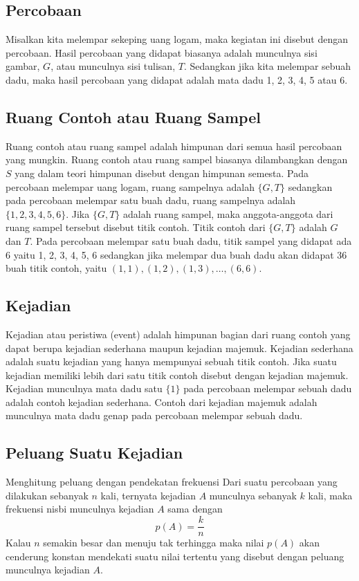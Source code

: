     \subsection{Percobaan}
Misalkan kita melempar sekeping uang logam, maka kegiatan ini disebut dengan percobaan. Hasil 
percobaan yang didapat biasanya adalah munculnya sisi gambar, $G$, atau munculnya sisi tulisan, $T$. 
Sedangkan jika kita melempar sebuah dadu, maka hasil percobaan yang didapat adalah mata dadu 1, 
2, 3, 4, 5 atau 6. 

\subsection{Ruang Contoh atau Ruang Sampel} 
Ruang contoh atau ruang sampel adalah himpunan dari semua hasil percobaan yang mungkin. Ruang 
contoh atau ruang sampel biasanya dilambangkan dengan $S$ yang dalam teori himpunan disebut 
dengan himpunan semesta. 
Pada percobaan melempar uang logam, ruang sampelnya adalah $\{G, T\}$ sedangkan pada percobaan
melempar satu buah dadu, ruang sampelnya adalah $\{1, 2, 3, 4, 5, 6\}$. 
Jika $\{G, T\}$ adalah ruang sampel, maka anggota-anggota dari ruang sampel tersebut disebut titik
contoh. Titik contoh dari $\{G, T\}$ adalah $G$ dan $T$. Pada percobaan melempar satu buah dadu, titik 
sampel yang didapat ada 6 yaitu 1, 2, 3, 4, 5, 6 sedangkan jika melempar dua buah dadu akan didapat
36 buah titik contoh, yaitu $(1, 1), (1, 2), (1, 3), \dots , (6, 6)$. 

\subsection{Kejadian}
Kejadian atau peristiwa (event) adalah himpunan bagian dari ruang contoh yang dapat berupa
kejadian sederhana maupun kejadian majemuk. Kejadian sederhana adalah suatu kejadian yang
hanya mempunyai sebuah titik contoh. Jika suatu kejadian memiliki lebih dari satu titik contoh 
disebut dengan kejadian majemuk. 
Kejadian munculnya mata dadu satu $\{1\}$ pada percobaan melempar sebuah dadu adalah contoh 
kejadian sederhana. Contoh dari kejadian majemuk adalah munculnya mata dadu genap pada 
percobaan melempar sebuah dadu. 
    
\subsection{Peluang Suatu Kejadian}
Menghitung peluang dengan pendekatan frekuensi 
Dari suatu percobaan yang dilakukan sebanyak $n$ kali, ternyata kejadian $A$ munculnya sebanyak 
$k$ kali, maka frekuensi nisbi munculnya kejadian $A$ sama dengan 
$$p(A)=\dfrac{k}{n}$$
Kalau $n$ semakin besar dan menuju tak terhingga maka nilai $p(A)$ akan cenderung konstan 
mendekati suatu nilai tertentu yang disebut dengan peluang munculnya kejadian $A$.

